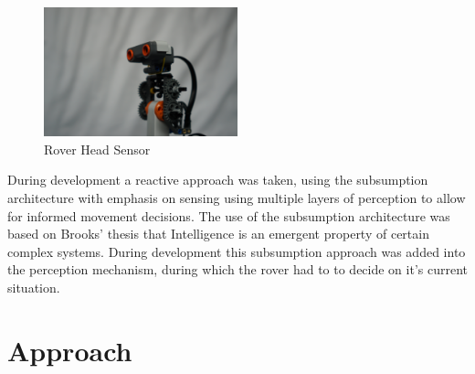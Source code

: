 \documentclass[a4paper,12pt,twocolumn]{report}
\begin{document}
\begin{figure}[b]
 \includegraphics[width=0.5\textwidth]{headshot}
 \caption{Rover Head Sensor}
 \label{fig:stanley-head}
\end{figure}

During development a reactive approach was taken, using the subsumption architecture \citep{wooldridge2009introduction} with emphasis on sensing using multiple layers of perception to allow for informed movement decisions. The use of the subsumption architecture was based on Brooks' thesis that Intelligence is an emergent property of certain complex systems. \citep{brooks1991intelligence} During development this subsumption approach was added into the perception mechanism, during which the rover had to to decide on it's current situation.

\section{Approach}



\end{document}
